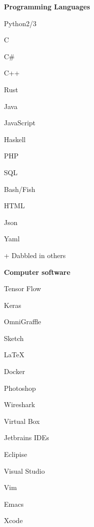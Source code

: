 \documentclass[a4paper,12pt,final]{memoir}
\newcommand{\SmallSep}{\vspace{0.5em}}
\newcommand{\CVItem}[1]
	{\textbf{\color{RoyalBlue} #1}}
\begin{document}
\CVItem{Programming Languages}
\begin{multicols}{4}
\begin{compactitem}[\color{RoyalBlue}$\circ$]
	\item Python2/3  
	\item C 
	\item {C\#}
	\item C++
	\item Rust 
	\item Java
	\item JavaScript 
	\item Haskell
	\item PHP 
	\item SQL
	\item Bash/Fish
	\item HTML
	\item Json
	\item Yaml
	\item + Dabbled in others 
\end{compactitem}
\end{multicols}

\SmallSep

\CVItem{Computer software}
\begin{multicols}{4}
\begin{compactitem}[\color{RoyalBlue}$\circ$]
	\item Tensor Flow 
	\item Keras
	\item OmniGraffle 
	\item Sketch
	\item \LaTeX 
	\item Docker 
	\item Photoshop 
	\item Wireshark
	\item Virtual Box
	\item Jetbrains IDEs
	\item Eclipise 
	\item Visual Studio
	\item Vim
	\item Emacs
	\item Xcode
\end{compactitem}
\end{multicols}
\SmallSep

\framebreak
\clearpage



\end{document}
